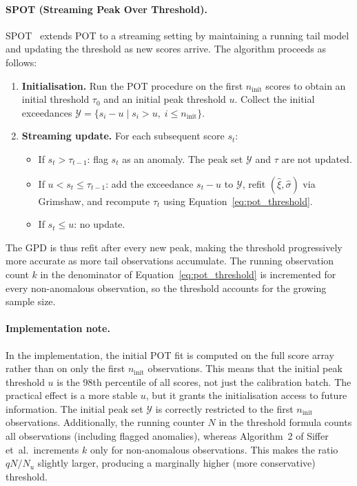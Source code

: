 \documentclass[11pt]{report}
\begin{document}
\paragraph{SPOT (Streaming Peak Over Threshold).}
SPOT~\cite{siffer:hal-01640325} extends POT to a streaming setting by maintaining a running tail model and updating the threshold as new scores arrive. The algorithm proceeds as follows:

\begin{enumerate}
  \item \textbf{Initialisation.} Run the POT procedure on the first $n_{\text{init}}$ scores to obtain an initial threshold $\tau_0$ and an initial peak threshold $u$. Collect the initial exceedances $\mathcal{Y} = \{s_i - u \mid s_i > u,\; i \le n_{\text{init}}\}$.
  \item \textbf{Streaming update.} For each subsequent score $s_t$:
  \begin{itemize}
    \item If $s_t > \tau_{t-1}$: flag $s_t$ as an anomaly. The peak set $\mathcal{Y}$ and $\tau$ are not updated.
    \item If $u < s_t \le \tau_{t-1}$: add the exceedance $s_t - u$ to $\mathcal{Y}$, refit $(\hat{\xi}, \hat{\sigma})$ via Grimshaw, and recompute $\tau_t$ using Equation~\eqref{eq:pot_threshold}.
    \item If $s_t \le u$: no update.
  \end{itemize}
\end{enumerate}

The GPD is thus refit after every new peak, making the threshold progressively more accurate as more tail observations accumulate. The running observation count $k$ in the denominator of Equation~\eqref{eq:pot_threshold} is incremented for every non-anomalous observation, so the threshold accounts for the growing sample size.

\paragraph{Implementation note.}
In the implementation, the initial POT fit is computed on the full score array rather than on only the first $n_{\text{init}}$ observations. This means that the initial peak threshold $u$ is the 98th percentile of all scores, not just the calibration batch. The practical effect is a more stable $u$, but it grants the initialisation access to future information. The initial peak set $\mathcal{Y}$ is correctly restricted to the first $n_{\text{init}}$ observations. Additionally, the running counter $N$ in the threshold formula counts all observations (including flagged anomalies), whereas Algorithm~2 of Siffer et~al.\ increments $k$ only for non-anomalous observations. This makes the ratio $qN/N_u$ slightly larger, producing a marginally higher (more conservative) threshold.
\end{document}
